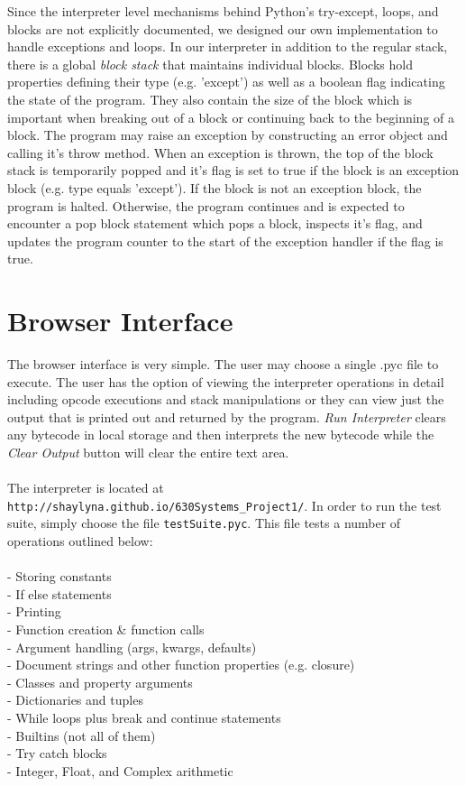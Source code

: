\documentclass{article}
\begin{document}
Since the interpreter level mechanisms behind Python's try-except, loops, and blocks are not explicitly documented, we designed our own implementation to handle exceptions and loops.  In our interpreter in addition to the regular stack, there is a global {\em block stack} that maintains individual blocks. Blocks hold properties defining their type (e.g. 'except') as well as a boolean flag indicating the state of the program. They also contain the size of the block which is important when breaking out of a block or continuing back to the beginning of a block. The program may raise an exception by constructing an error object and calling it's throw method. When an exception is thrown, the top of the block stack is temporarily popped and it's flag is set to true if the block is an exception block (e.g. type equals 'except').  If the block is not an exception block, the program is halted.  Otherwise, the program continues and is expected to encounter a pop block statement which pops a block, inspects it's flag, and updates the program counter to the start of the exception handler if the flag is true.

\section{Browser Interface}

The browser interface is very simple.  The user may choose a single .pyc file to execute. The user has the option of viewing the interpreter operations in detail including opcode executions and stack manipulations or they can view just the output that is printed out and returned by the program.  {\em Run Interpreter} clears any bytecode in local storage and then interprets the new bytecode while the {\em Clear Output} button will clear the entire text area.\\
\\
The interpreter is located at \verb!http://shaylyna.github.io/630Systems_Project1/!.  In order to run the test suite, simply choose the file \verb!testSuite.pyc!.  This file tests a number of operations outlined below:\\
\\
- Storing constants\\
- If else statements\\
- Printing\\
- Function creation \& function calls\\
- Argument handling (args, kwargs, defaults)\\
- Document strings and other function properties (e.g. closure)\\
- Classes and property arguments\\
- Dictionaries and tuples\\
- While loops plus break and continue statements\\
- Builtins (not all of them)\\
- Try catch blocks\\
- Integer, Float, and Complex arithmetic\\
\end{document}
